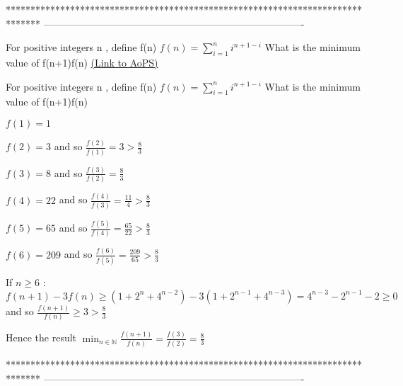 *******************************************************************************
-------------------------------------------------------------------------------

\begin{problem}
	For positive integers n , define f(n)
$f(n)=\sum_{i=1}^{n}i^{n+1-i}$
What is the minimum value of f(n+1)\/f(n)
	\flushright \href{https://artofproblemsolving.com/community/c6h559844}{(Link to AoPS)}
\end{problem}



\begin{solution}
	\begin{tcolorbox}For positive integers n , define f(n)
$f(n)=\sum_{i=1}^{n}i^{n+1-i}$
What is the minimum value of f(n+1)\/f(n)\end{tcolorbox}
$f(1)=1$

$f(2)=3$ and so $\frac{f(2)}{f(1)}=3>\frac 83$

$f(3)=8$ and so $\frac{f(3)}{f(2)}=\frac 83$

$f(4)=22$ and so $\frac{f(4)}{f(3)}=\frac{11}4>\frac 83$

$f(5)=65$ and so $\frac{f(5)}{f(4)}=\frac{65}{22}>\frac 83$

$f(6)=209$ and so $\frac{f(6)}{f(5)}=\frac{209}{65}>\frac 83$

If $n\ge 6$ : $f(n+1)-3f(n)\ge (1+2^n+4^{n-2})-3(1+2^{n-1}+4^{n-3})=4^{n-3}-2^{n-1}-2\ge 0$ and so $\frac{f(n+1)}{f(n)}\ge 3>\frac 83$

Hence the result $\boxed{\min_{n\in\mathbb N}\frac{f(n+1)}{f(n)}=\frac{f(3)}{f(2)}=\frac 83}$
\end{solution}
*******************************************************************************
-------------------------------------------------------------------------------

